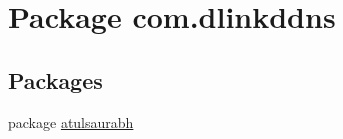 \hypertarget{namespacecom_1_1dlinkddns}{}\section{Package com.\+dlinkddns}
\label{namespacecom_1_1dlinkddns}
\subsection*{Packages}
\begin{DoxyCompactItemize}
\item 
package \mbox{\hyperlink{namespacecom_1_1dlinkddns_1_1atulsaurabh}{atulsaurabh}}
\end{DoxyCompactItemize}
